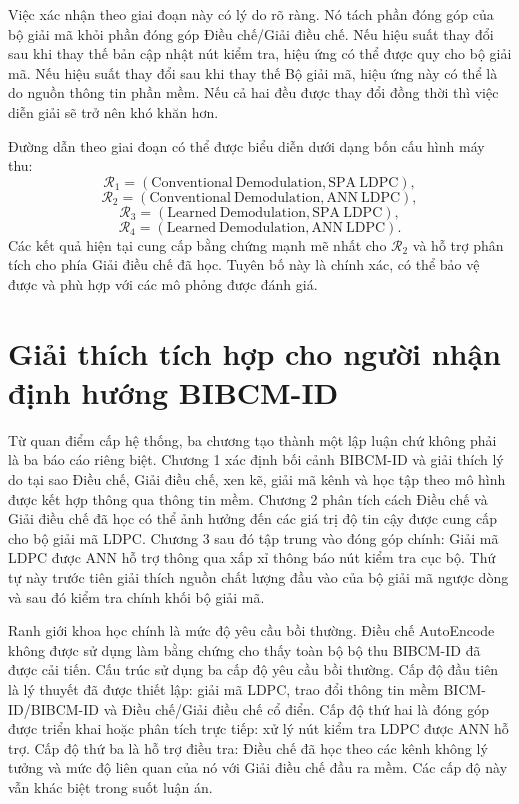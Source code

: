 Việc xác nhận theo giai đoạn này có lý do rõ ràng. Nó tách phần đóng góp của bộ giải mã khỏi phần đóng góp Điều chế/Giải điều chế. Nếu hiệu suất thay đổi sau khi thay thế bản cập nhật nút kiểm tra, hiệu ứng có thể được quy cho bộ giải mã. Nếu hiệu suất thay đổi sau khi thay thế Bộ giải mã, hiệu ứng này có thể là do nguồn thông tin phần mềm. Nếu cả hai đều được thay đổi đồng thời thì việc diễn giải sẽ trở nên khó khăn hơn.

Đường dẫn theo giai đoạn có thể được biểu diễn dưới dạng bốn cấu hình máy thu:
\begin{equation}
  \mathcal{R}_1=(\mathrm{Conventional\ Demodulation},\mathrm{SPA\ LDPC}),
\end{equation}
\begin{equation}
  \mathcal{R}_2=(\mathrm{Conventional\ Demodulation},\mathrm{ANN\ LDPC}),
\end{equation}
\begin{equation}
  \mathcal{R}_3=(\mathrm{Learned\ Demodulation},\mathrm{SPA\ LDPC}),
\end{equation}
\begin{equation}
  \mathcal{R}_4=(\mathrm{Learned\ Demodulation},\mathrm{ANN\ LDPC}).
\end{equation}
Các kết quả hiện tại cung cấp bằng chứng mạnh mẽ nhất cho $\mathcal{R}_2$ và hỗ trợ phân tích cho phía Giải điều chế đã học. Tuyên bố này là chính xác, có thể bảo vệ được và phù hợp với các mô phỏng được đánh giá.

\section{Giải thích tích hợp cho người nhận định hướng BIBCM-ID}
Từ quan điểm cấp hệ thống, ba chương tạo thành một lập luận chứ không phải là ba báo cáo riêng biệt. Chương 1 xác định bối cảnh BIBCM-ID và giải thích lý do tại sao Điều chế, Giải điều chế, xen kẽ, giải mã kênh và học tập theo mô hình được kết hợp thông qua thông tin mềm. Chương 2 phân tích cách Điều chế và Giải điều chế đã học có thể ảnh hưởng đến các giá trị độ tin cậy được cung cấp cho bộ giải mã LDPC. Chương 3 sau đó tập trung vào đóng góp chính: Giải mã LDPC được ANN hỗ trợ thông qua xấp xỉ thông báo nút kiểm tra cục bộ. Thứ tự này trước tiên giải thích nguồn chất lượng đầu vào của bộ giải mã ngược dòng và sau đó kiểm tra chính khối bộ giải mã.

Ranh giới khoa học chính là mức độ yêu cầu bồi thường. Điều chế AutoEncode không được sử dụng làm bằng chứng cho thấy toàn bộ bộ thu BIBCM-ID đã được cải tiến. Cấu trúc sử dụng ba cấp độ yêu cầu bồi thường. Cấp độ đầu tiên là lý thuyết đã được thiết lập: giải mã LDPC, trao đổi thông tin mềm BICM-ID/BIBCM-ID và Điều chế/Giải điều chế cổ điển. Cấp độ thứ hai là đóng góp được triển khai hoặc phân tích trực tiếp: xử lý nút kiểm tra LDPC được ANN hỗ trợ. Cấp độ thứ ba là hỗ trợ điều tra: Điều chế đã học theo các kênh không lý tưởng và mức độ liên quan của nó với Giải điều chế đầu ra mềm. Các cấp độ này vẫn khác biệt trong suốt luận án.

